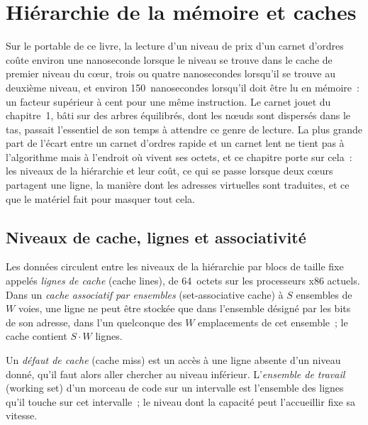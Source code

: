 \chapter{Hiérarchie de la mémoire et caches}\label{ch:ll:memory-hierarchy-and-caches}

Sur le portable de ce livre, la lecture d'un niveau de prix d'un carnet d'ordres coûte environ une nanoseconde lorsque le niveau se trouve dans le
cache de premier niveau du cœur, trois ou quatre nanosecondes lorsqu'il se trouve au deuxième niveau, et environ 150~nanosecondes lorsqu'il
doit être lu en mémoire~: un facteur supérieur à cent pour une même instruction. Le carnet jouet du chapitre~1, bâti sur des arbres équilibrés,
dont les nœuds sont dispersés dans le tas, passait l'essentiel de son temps à attendre ce genre de lecture. La plus grande part de l'écart
entre un carnet d'ordres rapide et un carnet lent ne tient pas à l'algorithme mais à l'endroit où vivent ses octets, et ce chapitre porte sur cela~:
les niveaux de la hiérarchie et leur coût, ce qui se passe lorsque deux cœurs partagent une ligne, la manière dont les adresses virtuelles
sont traduites, et ce que le matériel fait pour masquer tout cela.

\section{Niveaux de cache, lignes et associativité}

\begin{definition}\label{def:ll:memory-hierarchy-and-caches:line}
Les données circulent entre les niveaux de la hiérarchie par blocs de taille fixe appelés \emph{lignes de cache} (cache lines), de 64~octets
sur les processeurs x86 actuels. Dans un \emph{cache associatif par ensembles} (set-associative cache) à $S$ ensembles de $W$ voies, une
ligne ne peut être stockée que dans l'ensemble désigné par les bits de son adresse, dans l'un quelconque des $W$ emplacements de cet ensemble~; le cache contient
$S \cdot W$ lignes.
\end{definition}

\begin{definition}\label{def:ll:memory-hierarchy-and-caches:miss}
Un \emph{défaut de cache} (cache miss) est un accès à une ligne absente d'un niveau donné, qu'il faut alors
aller chercher au niveau inférieur. L'\emph{ensemble de travail} (working set) d'un morceau de code sur un intervalle est l'ensemble des
lignes qu'il touche sur cet intervalle~; le niveau dont la capacité peut l'accueillir fixe sa vitesse.
\end{definition}

